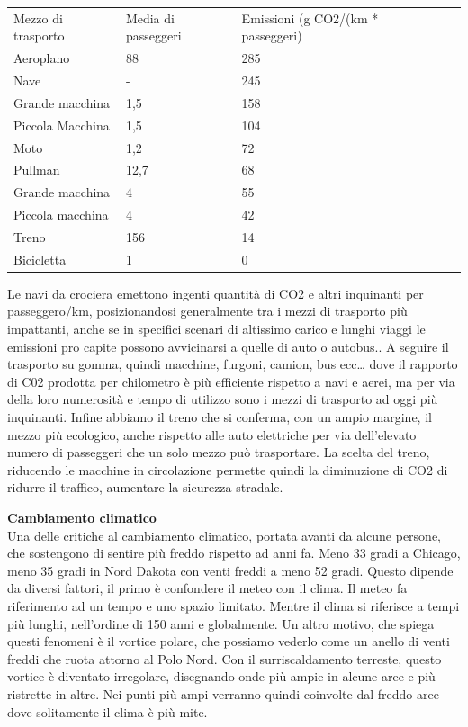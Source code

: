 \documentclass[12pt]{book} %
\begin{document}
\begin{table}[]
\begin{tabular}{lllll}
Mezzo di trasporto & Media di passeggeri & Emissioni (g CO2/(km * passeggeri) & & \\
Aeroplano & 88 & 285 & & \\
Nave & - & 245 & & \\
Grande macchina & 1,5 & 158 & & \\
Piccola Macchina & 1,5 & 104 & & \\
Moto & 1,2 & 72 & & \\
Pullman & 12,7 & 68 & & \\
Grande macchina & 4 & 55 & & \\
Piccola macchina & 4 & 42 & & \\
Treno & 156 & 14 & & \\
Bicicletta & 1 & 0 & & 
\end{tabular}
\end{table}

Le navi da crociera emettono ingenti quantità di CO2 e altri inquinanti per passeggero/km, posizionandosi generalmente tra i mezzi di trasporto più impattanti, anche se in specifici scenari di altissimo carico e lunghi viaggi le emissioni pro capite possono avvicinarsi a quelle di auto o autobus.. A seguire il trasporto
su gomma, quindi macchine, furgoni, camion, bus ecc… dove il rapporto di C02 prodotta per chilometro è più efficiente rispetto a navi e aerei, ma per via della loro numerosità e tempo di utilizzo sono i mezzi di trasporto ad
oggi più inquinanti. Infine abbiamo il treno che si conferma, con un ampio margine, il mezzo più ecologico, anche
rispetto alle auto elettriche per via dell'elevato numero di passeggeri che un solo mezzo può
trasportare. 
La scelta del treno, riducendo le macchine in circolazione permette quindi la diminuzione di CO2 di ridurre il
traffico, aumentare la sicurezza stradale.

\noindent \textbf{\large Cambiamento climatico} \\
Una delle critiche al cambiamento climatico, portata avanti da alcune persone, che sostengono di sentire più freddo rispetto ad anni fa. 
Meno 33 gradi a Chicago, meno 35 gradi in Nord
Dakota con venti freddi a meno 52 gradi. Questo dipende da diversi fattori, il primo è confondere il meteo con il clima. Il meteo fa riferimento ad un tempo e uno spazio limitato. Mentre il clima si riferisce a tempi più lunghi,
nell'ordine di 150 anni e globalmente. Un altro motivo, che spiega questi fenomeni è il vortice polare, che possiamo vederlo come
un anello di venti freddi che ruota attorno al Polo Nord. Con il surriscaldamento terreste, questo vortice è diventato
irregolare, disegnando onde più ampie in alcune aree e più ristrette in altre. Nei punti più ampi verranno quindi
coinvolte dal freddo aree dove solitamente il clima è più mite. 
\end{document}
